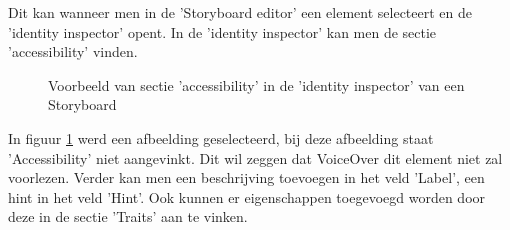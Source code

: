    Dit kan wanneer men in de  'Storyboard editor' een element selecteert en de 'identity inspector' opent. In de 'identity inspector' kan men de sectie 'accessibility' vinden. 
   \newpage
   \begin{figure}[h]
       \centering
       \caption{Voorbeeld van sectie 'accessibility' in de 'identity inspector' van een Storyboard }
       \label{fig:storyboardAccessibility}
   \end{figure}
In figuur \ref{fig:storyboardAccessibility} werd een afbeelding geselecteerd, bij deze afbeelding staat 'Accessibility' niet aangevinkt. Dit wil zeggen dat VoiceOver dit element niet zal voorlezen. Verder kan men een beschrijving toevoegen in het veld 'Label', een hint in het veld 'Hint'. Ook kunnen er eigenschappen toegevoegd worden door deze in de sectie 'Traits' aan te vinken.
 

